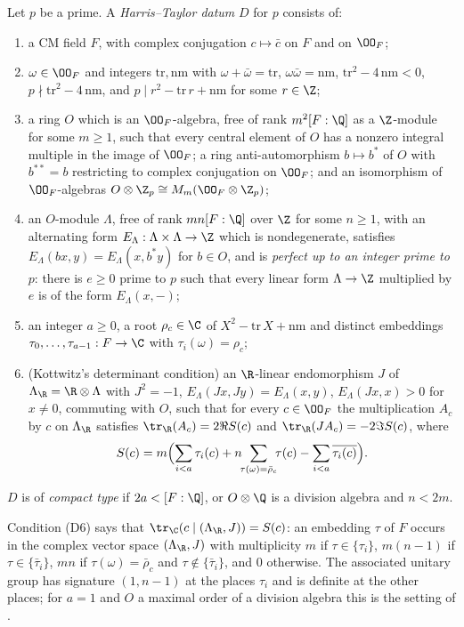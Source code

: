 \begin{definition}\label{pf:ks1:def-datum}
Let $p$ be a prime. A \emph{Harris--Taylor datum} $D$ for $p$ consists of:
\begin{enumerate}[label=(D\arabic*)]
\item a CM field $F$, with complex conjugation $c\mapsto\bar c$ on $F$ and on $\OO_F$;
\item $\omega\in\OO_F$ and integers $\mathrm{tr},\mathrm{nm}$ with $\omega+\bar\omega=\mathrm{tr}$,
  $\omega\bar\omega=\mathrm{nm}$, $\mathrm{tr}^2-4\,\mathrm{nm}<0$, $p\nmid\mathrm{tr}^2-4\,\mathrm{nm}$,
  and $p\mid r^2-\mathrm{tr}\,r+\mathrm{nm}$ for some $r\in\Z$;
\item a ring $O$ which is an $\OO_F$-algebra, free of rank $m^2[F:\Q]$ as a $\Z$-module for some $m\ge1$,
  such that every central element of $O$ has a nonzero integral multiple in the image of $\OO_F$; a ring
  anti-automorphism $b\mapsto b^*$ of $O$ with $b^{**}=b$ restricting to complex conjugation on $\OO_F$; and an
  isomorphism of $\OO_F$-algebras $O\otimes\Z_p\cong M_m(\OO_F\otimes\Z_p)$;
\item an $O$-module $\Lambda$, free of rank $mn[F:\Q]$ over $\Z$ for some $n\ge1$, with an alternating
  form $E_\Lambda:\Lambda\times\Lambda\to\Z$ which is nondegenerate, satisfies $E_\Lambda(bx,y)=E_\Lambda(x,b^*y)$
  for $b\in O$, and is \emph{perfect up to an integer prime to $p$}: there is $e\ge0$ prime to $p$ such
  that every linear form $\Lambda\to\Z$ multiplied by $e$ is of the form $E_\Lambda(x,-)$;
\item an integer $a\ge0$, a root $\rho_c\in\C$ of $X^2-\mathrm{tr}\,X+\mathrm{nm}$ and distinct embeddings
  $\tau_0,\dots,\tau_{a-1}:F\to\C$ with $\tau_i(\omega)=\rho_c$;
\item (Kottwitz's determinant condition) an $\R$-linear endomorphism $J$ of $\Lambda_\R=\R\otimes\Lambda$
  with $J^2=-1$, $E_\Lambda(Jx,Jy)=E_\Lambda(x,y)$, $E_\Lambda(Jx,x)>0$ for $x\neq0$, commuting with $O$, such
  that for every $c\in\OO_F$ the multiplication $A_c$ by $c$ on $\Lambda_\R$ satisfies
  $\tr_\R(A_c)=2\Re S(c)$ and $\tr_\R(JA_c)=-2\Im S(c)$, where
  \[ S(c)=m\Bigl(\sum_{i<a}\tau_i(c)+n\!\!\sum_{\tau(\omega)=\bar\rho_c}\!\!\tau(c)-\sum_{i<a}\overline{\tau_i(c)}\Bigr).\]
\end{enumerate}
$D$ is of \emph{compact type} if $2a<[F:\Q]$, or $O\otimes\Q$ is a division algebra and $n<2m$.
\end{definition}

Condition (D6) says that $\tr_\C(c\mid(\Lambda_\R,J))=S(c)$: an embedding $\tau$ of $F$ occurs in the
complex vector space $(\Lambda_\R,J)$ with multiplicity $m$ if $\tau\in\{\tau_i\}$, $m(n-1)$ if
$\tau\in\{\bar\tau_i\}$, $mn$ if $\tau(\omega)=\bar\rho_c$ and $\tau\notin\{\bar\tau_i\}$, and $0$ otherwise.
The associated unitary group has signature $(1,n-1)$ at the places $\tau_i$ and is definite at the other
places; for $a=1$ and $O$ a maximal order of a division algebra this is the setting of
\cite{HarrisTaylor2001}.

